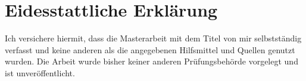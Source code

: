 
\chapter*{Eidesstattliche Erklärung}



Ich versichere hiermit, dass die Masterarbeit mit dem Titel \emph{\@title} von mir selbstständig verfasst und keine anderen als die angegebenen Hilfsmittel und Quellen genutzt wurden. 
Die Arbeit wurde bisher keiner anderen Prüfungsbehörde vorgelegt und ist unveröffentlicht.

\vspace{1cm}
\makebox[.45\textwidth][l]{\myplace, \@date}\makebox[.1\textwidth]{}\makebox[.45\textwidth][c]{\hrulefill}
\\
\makebox[.45\textwidth][l]{}\makebox[.1\textwidth]{}\makebox[.45\textwidth][c]{\@author}